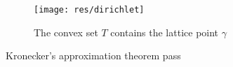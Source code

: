 \begin{figure}
  \begin{center}
    \texttt{[image: res/dirichlet]}
    \caption{The convex set \(T\) contains the lattice point \(γ\)}
    \label{fig:dirichlet}
  \end{center}
\end{figure}

\begin{thm}{Kronecker's approximation theorem}\label{thm:Kronecker}
  pass
\end{thm}

